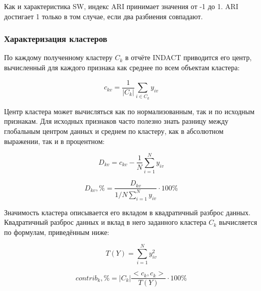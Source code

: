 \documentclass[12pt]{diploma}
\begin{document}
	Как и характеристика SW, индекс ARI принимает значения от -1 до 1. ARI достигает 1 только в том случае, если два разбиения совпадают.
	
	\subsubsection{Характеризация кластеров}
	По каждому полученному кластеру $ C_k $ в отчёте INDACT приводится его центр, вычисленный для каждого признака как среднее по всем объектам кластера:
	
	\begin{equation*} 
	c_{kv} = \frac{1}{|C_k|} \sum_{i \in C_k}^{} y_{iv}
	\end{equation*}
	
	Центр кластера может вычисляться как по нормализованным, так и по исходным признакам. Для исходных признаков часто полезно знать разницу между глобальным центром данных и среднем по кластеру, как в абсолютном выражении, так и в процентном:
	
	\vspace*{1\baselineskip} 
	\noindent\begin{minipage}{.5\linewidth}
		\begin{equation*}
		D_{kv} = c_{kv} - \frac{1}{N} \sum_{i=1}^{N} y_{iv}
		\end{equation*}
	\end{minipage}%
	\begin{minipage}{.5\linewidth}
		\begin{equation*}
		D_{kv},\% = \frac{D_{kv}}{1/N \sum_{i=1}^{N} y_{iv}} \cdot 100 \% 
		\end{equation*}
	\end{minipage}%
	\vspace*{1\baselineskip} 

	Значимость кластера описывается его вкладом в квадратичный разброс данных. Квадратичный разброс данных и вклад в него заданного кластера $ C_k $ вычисляется по формулам, приведённым ниже:
	
	
	\vspace*{1\baselineskip} 
	\noindent\begin{minipage}{.5\linewidth}
		\begin{equation*}
		T(Y) = \sum_{i=1}^{N} y_{iv}^2
		\end{equation*}
	\end{minipage}%
	\begin{minipage}{.5\linewidth}
		\begin{equation*}
		contrib_k,\% =  |C_k| \frac{<c_{k},c_{k}> }{T(Y)}\cdot 100\%
		\end{equation*}
	\end{minipage}%
	\vspace*{1\baselineskip} 
	
\end{document}

